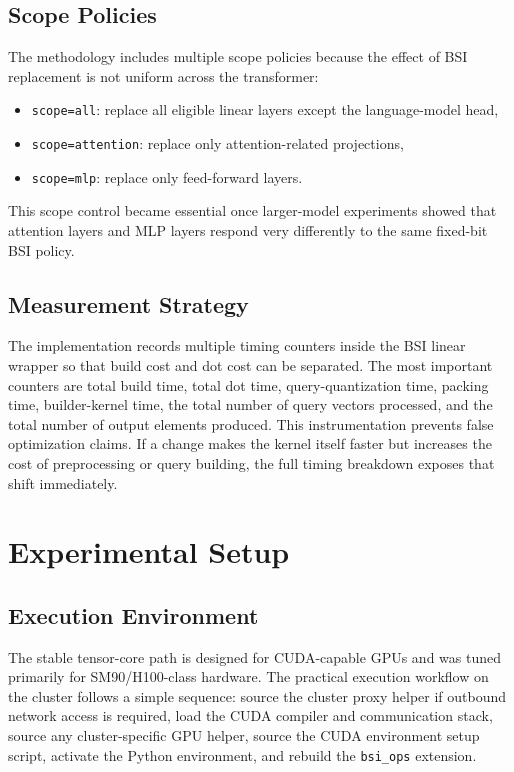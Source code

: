 \subsection{Scope Policies}
The methodology includes multiple scope policies because the effect of BSI replacement is not uniform across the transformer:

\begin{itemize}[leftmargin=2em]
\item \texttt{scope=all}: replace all eligible linear layers except the language-model head,
\item \texttt{scope=attention}: replace only attention-related projections,
\item \texttt{scope=mlp}: replace only feed-forward layers.
\end{itemize}

This scope control became essential once larger-model experiments showed that attention layers and MLP layers respond very differently to the same fixed-bit BSI policy.

\subsection{Measurement Strategy}
The implementation records multiple timing counters inside the BSI linear wrapper so that build cost and dot cost can be separated. The most important counters are total build time, total dot time, query-quantization time, packing time, builder-kernel time, the total number of query vectors processed, and the total number of output elements produced. This instrumentation prevents false optimization claims. If a change makes the kernel itself faster but increases the cost of preprocessing or query building, the full timing breakdown exposes that shift immediately.

\section{Experimental Setup}\label{sec:experimental-setup}
\subsection{Execution Environment}
The stable tensor-core path is designed for CUDA-capable GPUs and was tuned primarily for SM90/H100-class hardware. The practical execution workflow on the cluster follows a simple sequence: source the cluster proxy helper if outbound network access is required, load the CUDA compiler and communication stack, source any cluster-specific GPU helper, source the CUDA environment setup script, activate the Python environment, and rebuild the \texttt{bsi\_ops} extension.

